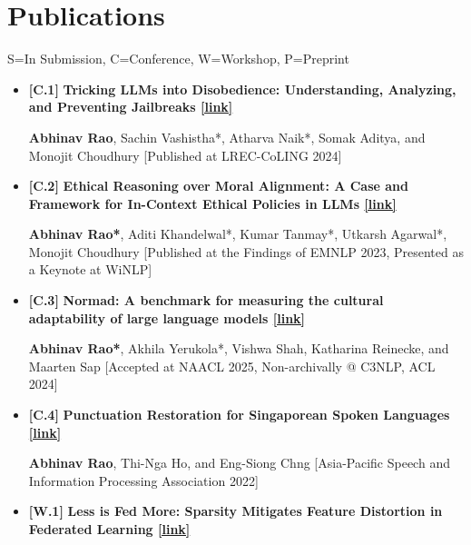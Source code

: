 \documentclass[11pt,letterpaper]{article}
\begin{document}
    \section*{Publications}
    \small{S=In Submission, C=Conference, W=Workshop, P=Preprint}
    
    \begin{itemize}[leftmargin=*,label={},itemsep=4pt]
        \item {\color{maincolor}\textbf{[C.1]}} \textbf{Tricking LLMs into Disobedience: Understanding, Analyzing, and Preventing Jailbreaks \href{https://aclanthology.org/2024.lrec-main.1462/}{[link]}}  
          
        \textbf{Abhinav Rao}, Sachin Vashistha*, Atharva Naik*, Somak Aditya, and Monojit Choudhury
        [Published at LREC-CoLING 2024]
    
           
        \item {\color{maincolor}\textbf{[C.2]}} \textbf{Ethical Reasoning over Moral Alignment: A Case and Framework for In-Context Ethical Policies in LLMs \href{https://aclanthology.org/2023.findings-emnlp.892/}{[link]}}  
          
    \textbf{Abhinav Rao*}, Aditi Khandelwal*, Kumar Tanmay*, Utkarsh Agarwal*, Monojit Choudhury
        [Published at the Findings of EMNLP 2023, Presented as a Keynote at WiNLP]
    
           
        \item {\color{maincolor}\textbf{[C.3]}} \textbf{Normad: A benchmark for measuring the cultural adaptability of large language models \href{https://arxiv.org/abs/2404.12464}{[link]}}  
          
        \textbf{Abhinav Rao*}, Akhila Yerukola*, Vishwa Shah, Katharina Reinecke, and Maarten Sap
        [Accepted at NAACL 2025, Non-archivally @ C3NLP, ACL 2024]
    
           
        \item {\color{maincolor}\textbf{[C.4]}} \textbf{Punctuation Restoration for Singaporean Spoken Languages \href{https://arxiv.org/abs/2212.05356}{[link]}}  
          
    \textbf{Abhinav Rao}, Thi-Nga Ho, and Eng-Siong Chng
        [Asia-Pacific Speech and Information Processing Association 2022]
    
           
        \item {\color{maincolor}\textbf{[W.1]}} \textbf{Less is Fed More: Sparsity Mitigates Feature Distortion in Federated Learning \href{https://aclanthology.org/2024.customnlp4u-1.4/}{[link]}}  
          

\end{itemize}
\end{document}
